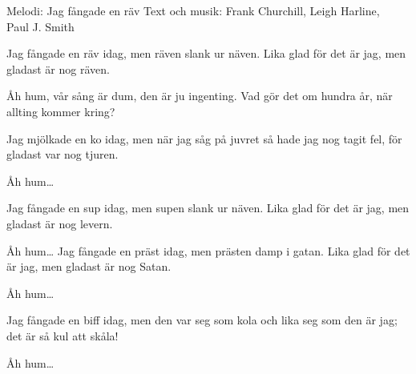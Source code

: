 \begin{song}

\begin{songmeta}
Melodi: Jag fångade en räv
Text och musik: Frank Churchill, Leigh Harline, \\ Paul J. Smith
\end{songmeta}

\begin{songtext}
Jag fångade en räv idag,
men räven slank ur näven.
Lika glad för det är jag,
men gladast är nog räven.

Åh hum, vår sång är dum,
den är ju ingenting.
Vad gör det om hundra år,
när allting kommer kring?

Jag mjölkade en ko idag,
men när jag såg på juvret
så hade jag nog tagit fel,
för gladast var nog tjuren.

Åh hum\ldots

Jag fångade en sup idag,
men supen slank ur näven.
Lika glad för det är jag,
men gladast är nog levern.

Åh hum\ldots
\newpage
Jag fångade en präst idag,
men prästen damp i gatan.
Lika glad för det är jag,
men gladast är nog Satan.

Åh hum\ldots

Jag fångade en biff idag,
men den var seg som kola
och lika seg som den är jag;
det är så kul att skåla!

Åh hum\ldots

\end{songtext}
\end{song}

